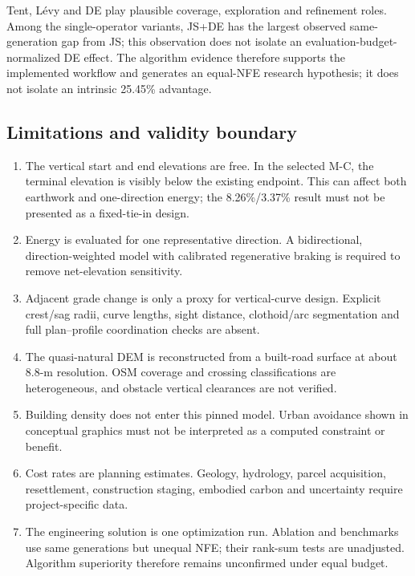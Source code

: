 \documentclass[preprint,12pt]{elsarticle}
\begin{document}
Tent, L\'evy and DE play plausible coverage, exploration and refinement roles. Among the single-operator variants, JS+DE has the largest observed same-generation gap from JS; this observation does not isolate an evaluation-budget-normalized DE effect. The algorithm evidence therefore supports the implemented workflow and generates an equal-NFE research hypothesis; it does not isolate an intrinsic 25.45\% advantage.

\subsection{Limitations and validity boundary}\label{sec:limitations}

\begin{enumerate}[leftmargin=*,label=(\arabic*)]
\item The vertical start and end elevations are free. In the selected M-C, the terminal elevation is visibly below the existing endpoint. This can affect both earthwork and one-direction energy; the 8.26\%/3.37\% result must not be presented as a fixed-tie-in design.
\item Energy is evaluated for one representative direction. A bidirectional, direction-weighted model with calibrated regenerative braking is required to remove net-elevation sensitivity.
\item Adjacent grade change is only a proxy for vertical-curve design. Explicit crest/sag radii, curve lengths, sight distance, clothoid/arc segmentation and full plan--profile coordination checks are absent.
\item The quasi-natural DEM is reconstructed from a built-road surface at about 8.8-m resolution. OSM coverage and crossing classifications are heterogeneous, and obstacle vertical clearances are not verified.
\item Building density does not enter this pinned model. Urban avoidance shown in conceptual graphics must not be interpreted as a computed constraint or benefit.
\item Cost rates are planning estimates. Geology, hydrology, parcel acquisition, resettlement, construction staging, embodied carbon and uncertainty require project-specific data.
\item The engineering solution is one optimization run. Ablation and benchmarks use same generations but unequal NFE; their rank-sum tests are unadjusted. Algorithm superiority therefore remains unconfirmed under equal budget.
\end{enumerate}
\end{document}
